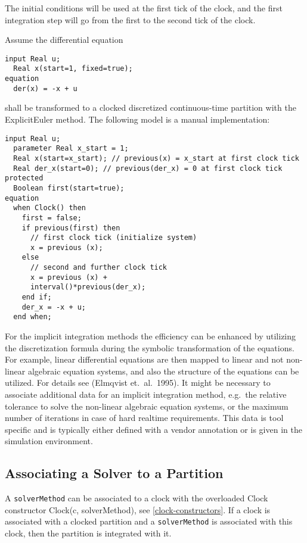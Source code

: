 The initial conditions will be used at the first tick of the clock, and
the first integration step will go from the first to the second tick of
the clock.

\begin{example}
Assume the differential equation
\begin{lstlisting}[language=modelica]
  input Real u;
  Real x(start=1, fixed=true);
equation
  der(x) = -x + u
\end{lstlisting}
shall be transformed to a clocked discretized continuous-time partition with the ExplicitEuler method.  The following model is a manual implementation:
\begin{lstlisting}[language=modelica]
  input Real u;
  parameter Real x_start = 1;
  Real x(start=x_start); // previous(x) = x_start at first clock tick
  Real der_x(start=0); // previous(der_x) = 0 at first clock tick
protected
  Boolean first(start=true);
equation
  when Clock() then
    first = false;
    if previous(first) then
      // first clock tick (initialize system)
      x = previous (x);
    else
      // second and further clock tick
      x = previous (x) +
      interval()*previous(der_x);
    end if;
    der_x = -x + u;
  end when;
\end{lstlisting}
\end{example}

\begin{nonnormative}
For the implicit integration methods the efficiency can be enhanced by utilizing the discretization formula during the symbolic transformation of the equations.  For example,
linear differential equations are then mapped to linear and not non-linear algebraic equation systems, and also the structure of the equations can be utilized.  For details see
(Elmqvist et.~al.\ 1995).  It might be necessary to associate additional data for an implicit integration method, e.g.\ the relative tolerance to solve the non-linear algebraic
equation systems, or the maximum number of iterations in case of hard realtime requirements.  This data is tool specific and is typically either defined with a vendor annotation
or is given in the simulation environment.
\end{nonnormative}

\subsection{Associating a Solver to a Partition}\label{associating-a-solver-to-a-partition}

A \lstinline!solverMethod! can be associated to a clock with the overloaded Clock
constructor Clock(c, solverMethod), see \cref{clock-constructors}. If a clock is
associated with a clocked partition and a \lstinline!solverMethod! is associated
with this clock, then the partition is integrated with it.

